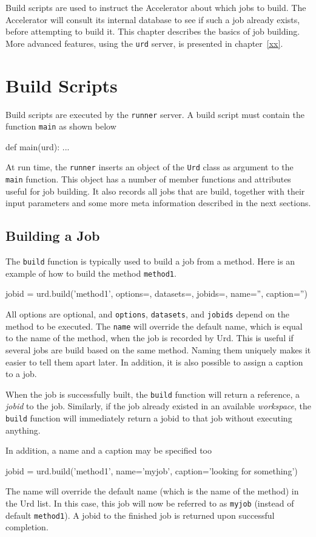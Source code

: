 
Build scripts are used to instruct the Accelerator about which jobs to
build.  The Accelerator will consult its internal database to see if
such a job already exists, before attempting to build it.  This
chapter describes the basics of job building.  More advanced features,
using the \texttt{urd} server, is presented in chapter~\ref{xx}.


\section{Build Scripts}
Build scripts are executed by the \texttt{runner} server.  A build
script must contain the function \texttt{main} as shown below
\begin{python}
def main(urd):
    ...
\end{python}
At run time, the \texttt{runner} inserts an object of the \texttt{Urd}
class as argument to the \texttt{main} function.  This object has a
number of member functions and attributes useful for job building.  It
also records all jobs that are build, together with their input
parameters and some more meta information described in the next
sections.

\subsection{Building a Job}
The \texttt{build} function is typically used to build a job from a
method.  Here is an example of how to build the method
\texttt{method1}.
\begin{python}
jobid = urd.build('method1', options={}, datasets={}, jobids={}, name='', caption='')
\end{python}
All options are optional, and \texttt{options}, \texttt{datasets}, and
\texttt{jobids} depend on the method to be executed.  The
\texttt{name} will override the default name, which is equal to the
name of the method, when the job is recorded by Urd.  This is useful
if several jobs are build based on the same method.  Naming them
uniquely makes it easier to tell them apart later.  In addition, it is
also possible to assign a caption to a job.

When the job is successfully built, the \texttt{build} function will
return a reference, a \textsl{jobid} to the job.  Similarly, if the
job already existed in an available \textsl{workspace}, the
\texttt{build} function will immediately return a jobid to that job
without executing anything.


In addition, a name and a caption may be specified too
\begin{python}
  jobid = urd.build('method1', name='myjob', caption='looking for something')
\end{python}
The name will override the default name (which is the name of the method) in the Urd list.  In this case,
this job will now be referred to as \texttt{myjob} (instead of default
\texttt{method1}).  A jobid to the finished job is returned upon
successful completion.



